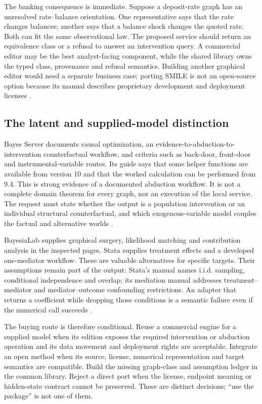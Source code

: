 The banking consequence is immediate. Suppose a deposit-rate graph has an
unresolved rate--balance orientation. One representative says that the rate
changes balances; another says that a balance shock changes the quoted rate.
Both can fit the same observational law. The proposed service should return an
equivalence class or a refusal to answer an intervention query. A commercial
editor may be the best analyst-facing component, while the shared library owns
the typed class, provenance and refusal semantics. Building another graphical
editor would need a separate business case; porting SMILE is not an
open-source option because its manual describes proprietary development and
deployment licenses
\citep{exec13_smile_intro,exec13_smile_license}.

\subsection{The latent and supplied-model distinction}

Bayes Server documents causal optimization, an evidence-to-abduction-to-
intervention counterfactual workflow, and criteria such as back-door, front-door
and instrumental-variable routes. Its guide says that some helper functions
are available from version 10 and that the worked calculation can be performed
from 9.4. This is strong evidence of a documented abduction workflow. It is
not a complete domain theorem for every graph, nor an execution of the local
service. The request must state whether the output is a population intervention
or an individual structural counterfactual, and which exogenous-variable model
couples the factual and alternative worlds
\citep{exec13_ci_bayesserver_causality}.

BayesiaLab supplies graphical surgery, likelihood matching and contribution
analysis in the inspected pages. Stata supplies treatment effects and a
developed one-mediator workflow. These are valuable alternatives for specific
targets. Their assumptions remain part of the output: Stata's manual names
i.i.d. sampling, conditional independence and overlap; its mediation manual
addresses treatment--mediator and mediator--outcome confounding restrictions.
An adapter that returns a coefficient while dropping those conditions is a
semantic failure even if the numerical call succeeds
\citep{exec13_ci_bayesia_surgery,exec13_ci_bayesia_matching,
exec13_ci_stata_causal_intro,exec13_ci_stata_mediate}.

The buying route is therefore conditional. Reuse a commercial engine for a
supplied model when its edition exposes the required intervention or abduction
operation and its data movement and deployment rights are acceptable. Integrate
an open method when its source, license, numerical representation and target
semantics are compatible. Build the missing graph-class and assumption ledger
in the common library. Reject a direct port when the license, endpoint meaning
or hidden-state contract cannot be preserved. These are distinct decisions;
``use the package'' is not one of them.

